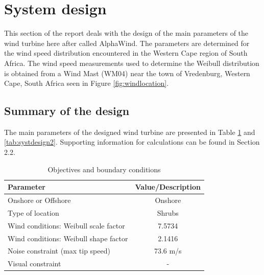 \section{System design} \label{sec:system design}
This section of the report deals with the design of the main parameters of the wind turbine here after called AlphaWind. The parameters are determined for the wind speed distribution encountered in the Western Cape region of South Africa. The wind speed measurements used to determine the Weibull distribution is obtained from a Wind Mast (WM04) near the town of Vredenburg, Western Cape, South Africa seen in Figure \ref{fig:windlocation}.


\subsection{Summary of the design}

The main parameters of the designed wind turbine are presented in Table \ref{tab:systdesign1} and \ref{tab:systdesign2}. Supporting information for calculations can be found in Section 2.2.

\begin{table}[H]
\begin{center} 
\caption{Objectives and boundary conditions}\label{tab:systdesign1}
\begin{tabular}{ |l|c| } 
\hline
\textbf{Parameter} & \textbf{Value/Description}  \\ 
\hline
Onshore or Offshore & Onshore  \\ 
\hline
Type of location & Shrubs \\ 
\hline
Wind conditions: Weibull scale factor & 7.5734 \\
\hline
Wind conditions: Weibull shape factor & 2.1416 \\
\hline
Noise constraint (max tip speed) & 73.6 m/s \\
\hline
Visual constraint & - \\
\hline
\end{tabular}
\end{center}
\end{table}

